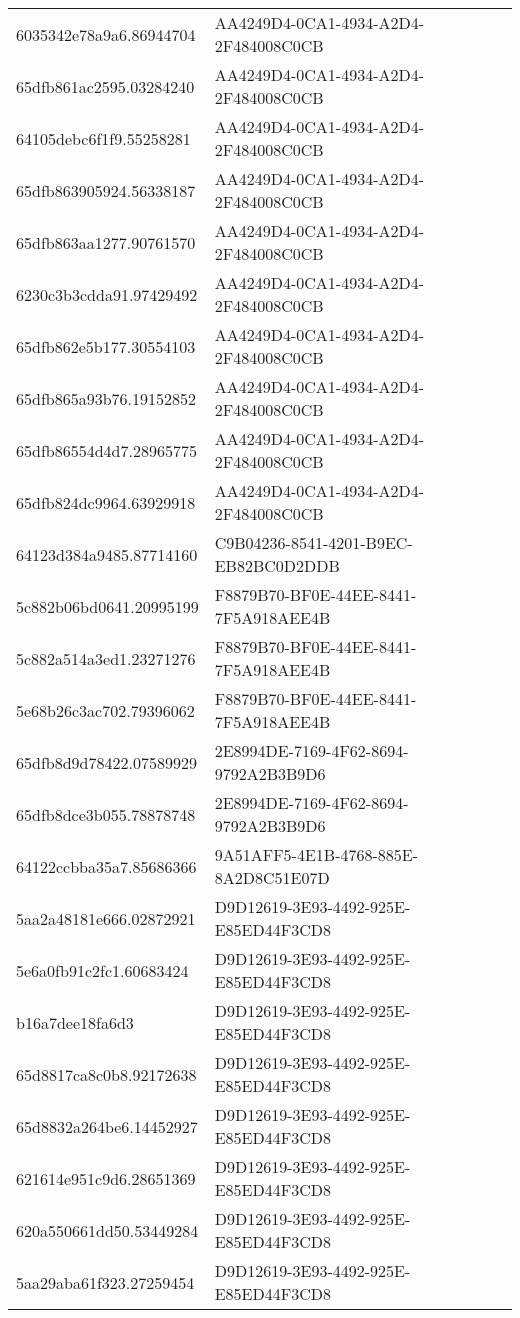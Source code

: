 \begin{tabular}{ll}
6035342e78a9a6.86944704 & AA4249D4-0CA1-4934-A2D4-2F484008C0CB \\
65dfb861ac2595.03284240 & AA4249D4-0CA1-4934-A2D4-2F484008C0CB \\
64105debc6f1f9.55258281 & AA4249D4-0CA1-4934-A2D4-2F484008C0CB \\
65dfb863905924.56338187 & AA4249D4-0CA1-4934-A2D4-2F484008C0CB \\
65dfb863aa1277.90761570 & AA4249D4-0CA1-4934-A2D4-2F484008C0CB \\
6230c3b3cdda91.97429492 & AA4249D4-0CA1-4934-A2D4-2F484008C0CB \\
65dfb862e5b177.30554103 & AA4249D4-0CA1-4934-A2D4-2F484008C0CB \\
65dfb865a93b76.19152852 & AA4249D4-0CA1-4934-A2D4-2F484008C0CB \\
65dfb86554d4d7.28965775 & AA4249D4-0CA1-4934-A2D4-2F484008C0CB \\
65dfb824dc9964.63929918 & AA4249D4-0CA1-4934-A2D4-2F484008C0CB \\
64123d384a9485.87714160 & C9B04236-8541-4201-B9EC-EB82BC0D2DDB \\
5c882b06bd0641.20995199 & F8879B70-BF0E-44EE-8441-7F5A918AEE4B \\
5c882a514a3ed1.23271276 & F8879B70-BF0E-44EE-8441-7F5A918AEE4B \\
5e68b26c3ac702.79396062 & F8879B70-BF0E-44EE-8441-7F5A918AEE4B \\
65dfb8d9d78422.07589929 & 2E8994DE-7169-4F62-8694-9792A2B3B9D6 \\
65dfb8dce3b055.78878748 & 2E8994DE-7169-4F62-8694-9792A2B3B9D6 \\
64122ccbba35a7.85686366 & 9A51AFF5-4E1B-4768-885E-8A2D8C51E07D \\
5aa2a48181e666.02872921 & D9D12619-3E93-4492-925E-E85ED44F3CD8 \\
5e6a0fb91c2fc1.60683424 & D9D12619-3E93-4492-925E-E85ED44F3CD8 \\
b16a7dee18fa6d3 & D9D12619-3E93-4492-925E-E85ED44F3CD8 \\
65d8817ca8c0b8.92172638 & D9D12619-3E93-4492-925E-E85ED44F3CD8 \\
65d8832a264be6.14452927 & D9D12619-3E93-4492-925E-E85ED44F3CD8 \\
621614e951c9d6.28651369 & D9D12619-3E93-4492-925E-E85ED44F3CD8 \\
620a550661dd50.53449284 & D9D12619-3E93-4492-925E-E85ED44F3CD8 \\
5aa29aba61f323.27259454 & D9D12619-3E93-4492-925E-E85ED44F3CD8 \\

\end{tabular}
